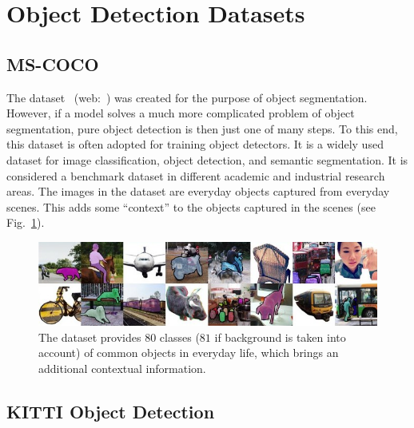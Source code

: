 \section{Object Detection Datasets}
\label{sec:ObjectDetectionDatasets}

\subsection{MS-COCO}
\label{ssec:DatasetMSCOCO}

The \mscoco{} dataset~\cite{lin2014mscoco} (web:~\cite{webmscocodataset}) was created for the purpose of object segmentation. However, if a model solves a much more complicated problem of object segmentation, pure object detection is then just one of many steps. To this end, this dataset is often adopted for training object detectors. It is a widely used dataset for image classification, object detection, and semantic segmentation. It is considered a benchmark dataset in different academic and industrial research areas. The images in the dataset are everyday objects captured from everyday scenes. This adds some “context” to the objects captured in the scenes (see Fig.~\ref{fig:MSCOCODataset}).

\begin{figure}[t]
    \centerline{\includegraphics[width=\linewidth]{figures/datasets/ms_coco_sample.jpeg}}
    \caption[\mscoco{} dataset]{The \mscoco{} dataset provides $80$ classes ($81$ if background is taken into account) of common objects in everyday life, which brings an additional contextual information. }
    \label{fig:MSCOCODataset}
\end{figure}

\subsection{KITTI Object Detection}
\label{ssec:DatasetKITTIObjectDetection}

